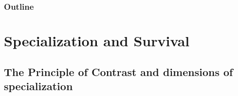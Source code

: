 \documentclass[hyperref={pdfpagelabels=false}]{beamer}
\begin{document}
		
	
	



\begin{frame}
\frametitle{Outline}
\tableofcontents
\end{frame}

\section{Specialization and Survival}

\subsection{The Principle of Contrast and dimensions of specialization}
\end{document}
